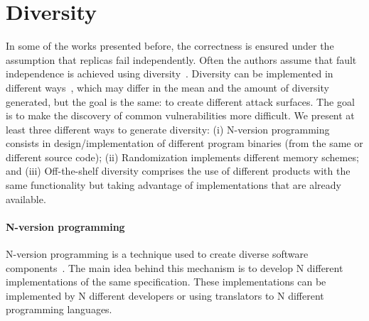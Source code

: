 \section{Diversity}
In some of the works presented before, the correctness is ensured under the assumption that replicas fail independently. 
Often the authors assume that fault independence is achieved using diversity~\cite{Castro:2002,Sousa:2010}. 
Diversity can be implemented in different ways~\cite{Deswarte:1998,Obelheiro:2006}, which may differ in the mean and the amount of diversity generated, but the goal is the same: to create different attack surfaces. 
The goal is to make the discovery of common vulnerabilities more difficult. 
We present at least three different ways to generate diversity: 
(i) N-version programming consists in design/implementation of different program binaries (from the same or different source code); 
(ii) Randomization implements different memory schemes; 
and (iii) Off-the-shelf diversity comprises the use of different products with the same functionality but taking advantage of implementations that are already available.


\paragraph{N-version programming}
N-version programming is a technique used to create diverse software components~\cite{Randell:1975,Avizienis:1977,Avizienis:1985,Knight:1986,Chen:1995}.
The main idea behind this mechanism is to develop N different implementations of the same specification. 
These implementations can be implemented by N different developers or using translators to N different programming languages.

